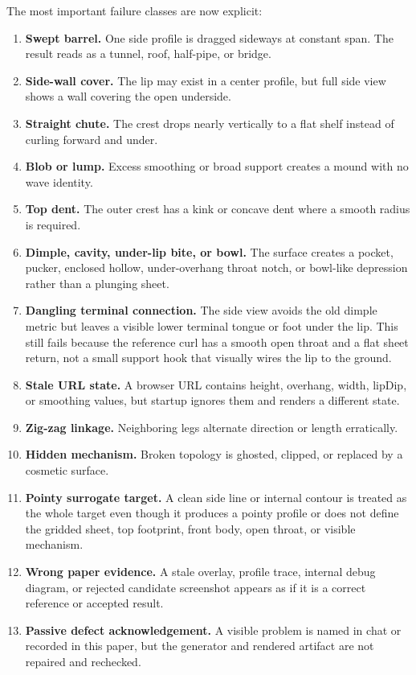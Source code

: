 \documentclass[12pt,letterpaper]{article}
\begin{document}
The most important failure classes are now explicit:
\begin{enumerate}
  \item \textbf{Swept barrel.} One side profile is dragged sideways at constant span. The result reads as a tunnel, roof, half-pipe, or bridge.
  \item \textbf{Side-wall cover.} The lip may exist in a center profile, but full side view shows a wall covering the open underside.
  \item \textbf{Straight chute.} The crest drops nearly vertically to a flat shelf instead of curling forward and under.
  \item \textbf{Blob or lump.} Excess smoothing or broad support creates a mound with no wave identity.
  \item \textbf{Top dent.} The outer crest has a kink or concave dent where a smooth radius is required.
  \item \textbf{Dimple, cavity, under-lip bite, or bowl.} The surface creates a pocket, pucker, enclosed hollow, under-overhang throat notch, or bowl-like depression rather than a plunging sheet.
  \item \textbf{Dangling terminal connection.} The side view avoids the old dimple metric but leaves a visible lower terminal tongue or foot under the lip. This still fails because the reference curl has a smooth open throat and a flat sheet return, not a small support hook that visually wires the lip to the ground.
  \item \textbf{Stale URL state.} A browser URL contains height, overhang, width, lipDip, or smoothing values, but startup ignores them and renders a different state.
  \item \textbf{Zig-zag linkage.} Neighboring legs alternate direction or length erratically.
  \item \textbf{Hidden mechanism.} Broken topology is ghosted, clipped, or replaced by a cosmetic surface.
  \item \textbf{Pointy surrogate target.} A clean side line or internal contour is treated as the whole target even though it produces a pointy profile or does not define the gridded sheet, top footprint, front body, open throat, or visible mechanism.
  \item \textbf{Wrong paper evidence.} A stale overlay, profile trace, internal debug diagram, or rejected candidate screenshot appears as if it is a correct reference or accepted result.
  \item \textbf{Passive defect acknowledgement.} A visible problem is named in chat or recorded in this paper, but the generator and rendered artifact are not repaired and rechecked.
\end{enumerate}
\end{document}
